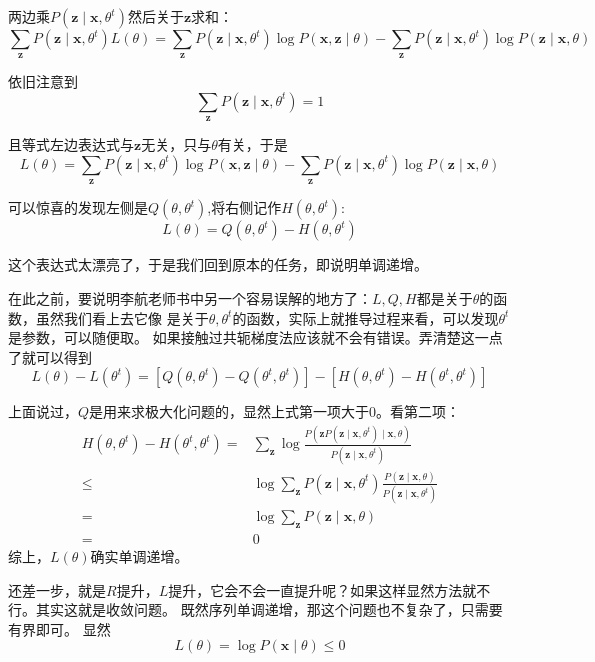 \documentclass{article}
\begin{document}
        两边乘$P(\boldsymbol{z}\mid\boldsymbol{x},\theta^t)$然后关于$\boldsymbol{z}$求和：
        \[\sum_{\boldsymbol{z}}P(\boldsymbol{z}\mid\boldsymbol{x},\theta^t)L(\theta)=\sum_{\boldsymbol{z}}P(\boldsymbol{z}\mid\boldsymbol{x},\theta^t)\log P(\boldsymbol{x},\boldsymbol{z}\mid \theta)-\sum_{\boldsymbol{z}}P(\boldsymbol{z}\mid\boldsymbol{x},\theta^t)\log P(\boldsymbol{z}\mid \boldsymbol{x},\theta)\]

        依旧注意到
        \[\sum_{\boldsymbol{z}}P(\boldsymbol{z}\mid\boldsymbol{x},\theta^t)=1\]

        且等式左边表达式与$\boldsymbol{z}$无关，只与$\theta$有关，于是
        \[L(\theta)=\sum_{\boldsymbol{z}}P(\boldsymbol{z}\mid\boldsymbol{x},\theta^t)\log P(\boldsymbol{x},\boldsymbol{z}\mid \theta)-\sum_{\boldsymbol{z}}P(\boldsymbol{z}\mid\boldsymbol{x},\theta^t)\log P(\boldsymbol{z}\mid \boldsymbol{x},\theta)\]

        可以惊喜的发现左侧是$Q(\theta,\theta^t)$,将右侧记作$H(\theta,\theta^t)$:
        \[L(\theta)=Q(\theta,\theta^t)-H(\theta,\theta^t)\]

        这个表达式太漂亮了，于是我们回到原本的任务，即说明单调递增。

        在此之前，要说明李航老师书中另一个容易误解的地方了：$L,Q,H$都是关于$\theta$的函数，虽然我们看上去它像
        是关于$\theta,\theta^t$的函数，实际上就推导过程来看，可以发现$\theta^t$是参数，可以随便取。
        如果接触过共轭梯度法应该就不会有错误。弄清楚这一点了就可以得到
        \[L(\theta)-L(\theta^t)=[Q(\theta,\theta^t)-Q(\theta^t,\theta^t)]-[H(\theta,\theta^t)-H(\theta^t,\theta^t)]\]

        上面说过，$Q$是用来求极大化问题的，显然上式第一项大于0。看第二项：
        \begin{align*}
            H(\theta,\theta^t)-H(\theta^t,\theta^t)=&\sum_{\boldsymbol{z}}\log \frac{P(\boldsymbol{z}P(\boldsymbol{z}\mid\boldsymbol{x},\theta^t)\mid \boldsymbol{x},\theta)}{P(\boldsymbol{z}\mid \boldsymbol{x},\theta^t)}\\
            \le &\log \sum_{\boldsymbol{z}}P(\boldsymbol{z}\mid \boldsymbol{x},\theta^t)\frac{P(\boldsymbol{z}\mid \boldsymbol{x},\theta)}{P(\boldsymbol{z}\mid \boldsymbol{x},\theta^t)}\\
            =&\log\sum_{\boldsymbol{z}}P(\boldsymbol{z}\mid \boldsymbol{x},\theta)\\
            =&0
        \end{align*}
        综上，$L(\theta)$确实单调递增。

        还差一步，就是$R$提升，$L$提升，它会不会一直提升呢？如果这样显然方法就不行。其实这就是收敛问题。
        既然序列单调递增，那这个问题也不复杂了，只需要有界即可。
        显然
        \[L(\theta)=\log P(\boldsymbol{x}\mid\theta)\le 0\]
\end{document}
